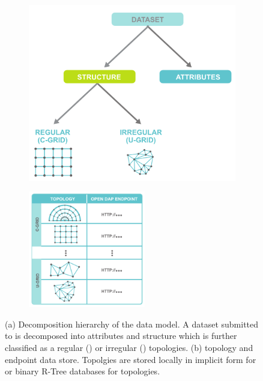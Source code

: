\begin{figure}[ht!]
  \centering
  \begin{subfigure}[t]{0.45\textwidth}
    \includegraphics[width=\textwidth]{../figs/data_model_hierarchy}
  \caption{}
  \label{fig:data_hierarchy}
  \end{subfigure}
  \begin{subfigure}[t]{0.45\textwidth}
    \includegraphics[height=2in]{../figs/sciwms_book_db_topology_endpoint_chart}
    \caption{}
    \label{fig:sciwms_topology_endpoints}
  \end{subfigure}
  \caption{(a) Decomposition hierarchy of the data model. A dataset
    submitted to \sciwms{} is decomposed into attributes and structure
    which is further classified as a regular (\cgrid{}) or irregular
    (\ugrid{}) topologies. (b) \Sciwms{} topology and endpoint data
    store. Topolgies are stored locally in implicit form for \cgrid{}
    or binary R-Tree databases for \ugrid{} topologies. }
\end{figure}

